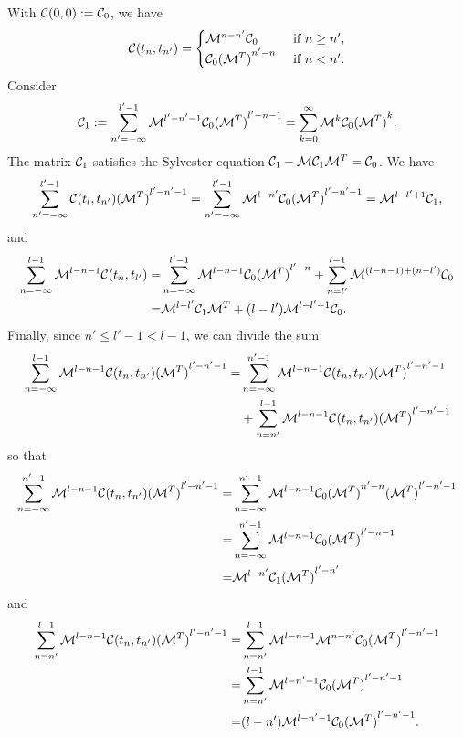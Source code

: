 \documentclass{article}
\begin{document}
With ${\mathcal C}(0,0):={\mathcal C}_0$, we have
$$
{\mathcal C}(t_{n},t_{n'})=
\begin{cases}
{\mathcal M}^{n-n'}{\mathcal C}_0& \text{ if } n\geq n',
\\
{\mathcal C}_0 {({\mathcal M}^{T})}^{n'-n}& \text{ if } n< n'.
\end{cases}
$$
Consider
$$
{\mathcal C}_{1}:=\sum_{n'=-\infty}^{l'-1}{\mathcal M}^{l'-n'-1}{\mathcal C}_0{({\mathcal M}^T)}^{l'-n-1}=\sum_{k=0}^{\infty}{\mathcal M}^{k}{\mathcal C}_0{({\mathcal M}^T)}^{k}.
$$
The matrix ${\mathcal C}_{1}$ satisfies the Sylvester equation ${\mathcal C}_1-{\mathcal M}{\mathcal C}_1{\mathcal M}^T={\mathcal C}_0$. We have
\begin{equation}\label{E:term2}
\sum_{n'=-\infty}^{l'-1}{\mathcal C}(t_l,t_{n'}){({\mathcal M}^T)}^{l'-n'-1}
=
\sum_{n'=-\infty}^{l'-1}{\mathcal M}^{l-n'}{\mathcal C}_0{({\mathcal M}^T)}^{l'-n'-1}
=
{\mathcal M}^{l-l'+1}{\mathcal C}_{1}
,
\end{equation}
and
\begin{equation}\label{E:term3}
\begin{aligned}
\sum_{n=-\infty}^{l-1}{{\mathcal M}}^{l-n-1}{\mathcal C}(t_n,t_{l'})
=
&\sum_{n=-\infty}^{l'-1}{{\mathcal M}}^{l-n-1}{\mathcal C}_0 {({\mathcal M}^{T})}^{l'-n}
+
\sum_{n=l'}^{l-1}{{\mathcal M}}^{(l-n-1)+(n-l')}{\mathcal C}_0
\\
=&
{\mathcal M}^{l-l'}{\mathcal C}_{1}{\mathcal M}^T+(l-l'){\mathcal M}^{l-l'-1}{\mathcal C}_{0}.
\end{aligned}
\end{equation}
Finally, since $n'\leq l'-1<l-1$, we can divide the sum
\begin{equation}
\begin{aligned}
\sum_{n=-\infty}^{l-1}{{\mathcal M}}^{l-n-1}{\mathcal C}(t_n,t_{n'}){({\mathcal M}^T)}^{l'-n'-1}
    =&\sum_{n=-\infty}^{n'-1}{{\mathcal M}}^{l-n-1}{\mathcal C}(t_n,t_{n'}){({\mathcal M}^T)}^{l'-n'-1}
    \\
    &+
    \sum_{n=n'}^{l-1}{{\mathcal M}}^{l-n-1}{\mathcal C}(t_n,t_{n'}){({\mathcal M}^T)}^{l'-n'-1}
\end{aligned}
\end{equation}
so that 
\begin{equation}
\begin{aligned}
    \sum_{n=-\infty}^{n'-1}{{\mathcal M}}^{l-n-1}{\mathcal C}(t_n,t_{n'}){({\mathcal M}^T)}^{l'-n'-1}
    =&
    \sum_{n=-\infty}^{n'-1}{{\mathcal M}}^{l-n-1}{\mathcal C}_0{({\mathcal M}^T)}^{n'-n}{({\mathcal M}^T)}^{l'-n'-1}
    \\
    =&
    \sum_{n=-\infty}^{n'-1}{{\mathcal M}}^{l-n-1}{\mathcal C}_0{({\mathcal M}^T)}^{l'-n-1}
    \\
    =&
    {{\mathcal M}}^{l-n'}{\mathcal C}_1{({\mathcal M}^T)}^{l'-n'}
\end{aligned}
\end{equation}
and
\begin{equation}
\begin{aligned}
    \sum_{n=n'}^{l-1}{{\mathcal M}}^{l-n-1}{\mathcal C}(t_n,t_{n'}){({\mathcal M}^T)}^{l'-n'-1}
    =&
    \sum_{n=n'}^{l-1}{{\mathcal M}}^{l-n-1}{{\mathcal M}}^{n-n'}{\mathcal C}_0{({\mathcal M}^T)}^{l'-n'-1}
    \\
    =&
    \sum_{n=n'}^{l-1}{{\mathcal M}}^{l-n'-1}{\mathcal C}_0{({\mathcal M}^T)}^{l'-n'-1}
    \\
    =&
    (l-n'){{\mathcal M}}^{l-n'-1}{\mathcal C}_0{({\mathcal M}^T)}^{l'-n'-1}.
\end{aligned}
\end{equation}
\end{document}
